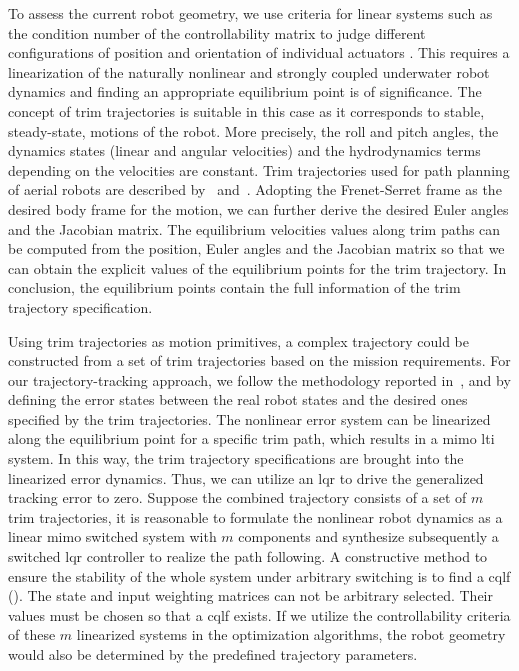 
To assess the current robot geometry, we use criteria for linear systems such as the condition number of the controllability matrix to judge different configurations of position and orientation of individual actuators . This requires a linearization of the naturally nonlinear and strongly coupled underwater robot dynamics and finding an appropriate equilibrium point is of significance. The concept of trim trajectories is suitable in this case as it corresponds to stable, steady-state, motions of the robot. More precisely, the roll and pitch angles, the dynamics states (linear and angular velocities) and the hydrodynamics terms depending on the velocities are constant. Trim trajectories used for path planning of aerial robots are described by~\cite{c2} and~\cite{c3}. Adopting the Frenet-Serret frame as the desired body frame for the motion, we can further derive the desired Euler angles and the Jacobian matrix. The equilibrium velocities values along trim paths can be computed from the position, Euler angles and the Jacobian matrix so that we can obtain the explicit values of the equilibrium points for the trim trajectory. In conclusion, the equilibrium points contain the full information of the trim trajectory specification.

Using trim trajectories as motion primitives, a complex trajectory could be constructed from a set of trim trajectories based on the mission requirements. For our trajectory-tracking approach, we follow the methodology reported in~\cite{c4}, \cite{c5} and \cite{c6} by defining the error states between the real robot states and the desired ones specified by the trim trajectories. The nonlinear error system can be linearized along the equilibrium point for a specific trim path, which results in a \ac{mimo} \ac{lti} system. In this way, the trim trajectory specifications are brought into the linearized error dynamics. Thus, we can utilize an \acf{lqr} to drive the generalized tracking error to zero. Suppose the combined trajectory consists of a set of $m$ trim trajectories, it is reasonable to formulate the nonlinear robot dynamics as a linear \ac{mimo} switched system with $m$ components and synthesize subsequently a switched \ac{lqr} controller to realize the path following. A constructive method to ensure the stability of the whole system under arbitrary switching is to find a \ac{cqlf} (\cite{c7}). The state and input weighting matrices can not be arbitrary selected. Their values must be chosen so that a \ac{cqlf} exists. If we utilize the controllability criteria of these $m$ linearized systems in the optimization algorithms, the robot geometry would also be determined by the predefined trajectory parameters.

